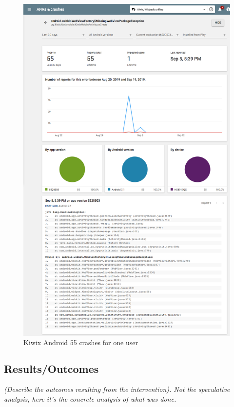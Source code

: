 \begin{figure}
    \centering
    \includegraphics[width=13.5cm]{images/android-vitals-screenshots/55-crashes-WebViewFactory-MissingWebViewPackageException_2019-09-19-kiwix_trimmed.png}
    \caption{Kiwix Android 55 crashes for one user}
    \label{fig:55-crashes-WebViewFactory-MissingWebViewPackageException}
\end{figure}

\FloatBarrier

\subsection{Results/Outcomes}
\textit{(Describe the outcomes resulting from the intervention). Not the speculative analysis, here it’s the concrete analysis of what was done.}

